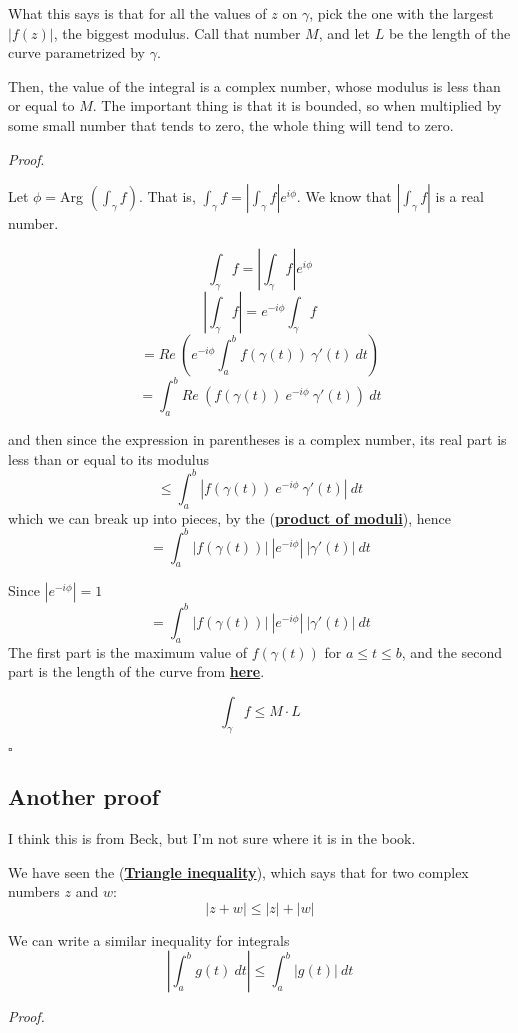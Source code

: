 \documentclass[11pt, oneside]{article}
\begin{document}
What this says is that for all the values of $z$ on $\gamma$, pick the one with the largest $|f(z)|$, the biggest modulus.  Call that number $M$, and let $L$ be the length of the curve parametrized by $\gamma$.

Then, the value of the integral is a complex number, whose modulus is less than or equal to $M$.  The important thing is that it is bounded, so when multiplied by some small number that tends to zero, the whole thing will tend to zero.

\emph{Proof}.

Let $\phi = $Arg $(\int_\gamma f)$.  That is, $\int_\gamma f = | \int_\gamma f | e^{i\phi}$.  We know that $| \int_\gamma f |$ is a real number.

\[ \int_\gamma f = | \int_\gamma f | e^{i\phi} \]
\[ | \int_\gamma f | = e^{-i\phi} \int_\gamma f \]
\[ = Re \ ( e^{-i\phi} \int_a^b f(\gamma(t)) \ \gamma'(t) \ dt ) \]
\[ = \int_a^b Re \ (f (\gamma(t)) \ e^{-i\phi} \ \gamma'(t)) \ dt \]

and then since the expression in parentheses is a complex number, its real part is less than or equal to its modulus
\[ \le \int_a^b | f (\gamma(t)) \ e^{-i\phi} \ \gamma'(t) | \ dt \]
which we can break up into pieces, by the (\hyperref[sec:product_of_moduli]{\textbf{product of moduli}}), hence
\[ = \int_a^b | f (\gamma(t)) | \ |e^{-i\phi}| \ |\gamma'(t)| \ dt \]

Since $|e^{-i\phi}| = 1$
\[ = \int_a^b | f (\gamma(t)) | \ |e^{-i\phi}| \ |\gamma'(t)| \ dt \]
The first part is the maximum value of $f(\gamma(t))$ for $a \le t \le b$, and the second part is the length of the curve from \hyperref[sec:length_of_curve]{\textbf{here}}.

\[ \int_\gamma f \le M \cdot L \]

$\square$

\subsection*{Another proof}

I think this is from Beck, but I'm not sure where it is in the book.

We have seen the (\hyperref[sec:tri_inequality]{\textbf{Triangle inequality}}), which says that for two complex numbers $z$ and $w$:
\[  |z + w| \le |z| + |w| \]

We can write a similar inequality for integrals
\[ | \int_a^b g(t) \ dt | \le \int_a^b | g(t) | \ dt \]

\emph{Proof.}
\end{document}
